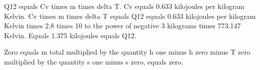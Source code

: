 Q12 equals Cv times m times delta T.  
Cv equals 0.633 kilojoules per kilogram Kelvin.  
Cv times m times delta T equals Q12 equals 0.633 kilojoules per kilogram Kelvin times 2.8 times 10 to the power of negative 3 kilograms times 773.147 Kelvin.  
Equals 1.375 kilojoules equals Q12.

Zero equals m total multiplied by the quantity h one minus h zero minus T zero multiplied by the quantity s one minus s zero, equals zero.